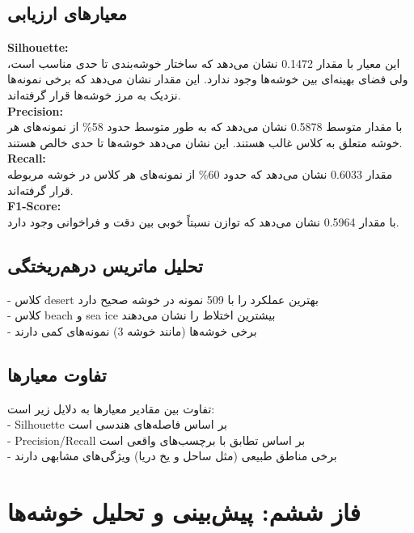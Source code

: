 \documentclass[a4paper,12pt]{article}
\let\nobreaksection\section
\renewcommand{\section}{\nobreaksection}
\begin{document}
	\subsection*{\textbf{معیارهای ارزیابی}}
	
	\textbf{ Silhouette:}
	\\
	این معیار با مقدار 0.1472 نشان می‌دهد که ساختار خوشه‌بندی تا حدی مناسب است، ولی فضای بهینه‌ای بین خوشه‌ها وجود ندارد. این مقدار نشان می‌دهد که برخی نمونه‌ها نزدیک به مرز خوشه‌ها قرار گرفته‌اند.
	\\
	\textbf{ Precision:}
	\\
	با مقدار متوسط 0.5878 نشان می‌دهد که به طور متوسط حدود 58\% از نمونه‌های هر خوشه متعلق به کلاس غالب هستند. این نشان می‌دهد خوشه‌ها تا حدی خالص هستند.
	\\
	\textbf{Recall:}
	\\
	مقدار 0.6033 نشان می‌دهد که حدود 60\% از نمونه‌های هر کلاس در خوشه مربوطه قرار گرفته‌اند.
	\\
	\textbf{F1-Score:}
	\\
	با مقدار 0.5964 نشان می‌دهد که توازن نسبتاً خوبی بین دقت و فراخوانی وجود دارد.
	
	\subsection*{\textbf{تحلیل ماتریس درهم‌ریختگی}}
	- کلاس desert بهترین عملکرد را با 509 نمونه در خوشه صحیح دارد
	\\
	- کلاس beach و sea ice بیشترین اختلاط را نشان می‌دهند
	\\
	- برخی خوشه‌ها (مانند خوشه 3) نمونه‌های کمی دارند

	
	\subsection*{\textbf{تفاوت معیارها}}
	تفاوت بین مقادیر معیارها به دلایل زیر است:
	\\
	- Silhouette بر اساس فاصله‌های هندسی است
	\\
	- Precision/Recall بر اساس تطابق با برچسب‌های واقعی است
	\\
	- برخی مناطق طبیعی (مثل ساحل و یخ دریا) ویژگی‌های مشابهی دارند
	
	
	
	\section{فاز ششم: پیش‌بینی و تحلیل خوشه‌ها}
	
\end{document}
